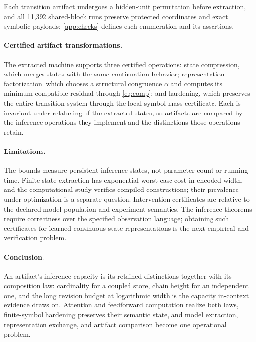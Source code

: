 \documentclass{article}
\theoremstyle{definition}
\begin{document}
Each transition artifact undergoes a hidden-unit permutation before extraction, and all 11,392 shared-block runs preserve protected coordinates and exact symbolic payloads; \cref{app:checks} defines each enumeration and its assertions.

\paragraph{Certified artifact transformations.}
The extracted machine supports three certified operations: state compression, which merges states with the same continuation behavior; representation factorization, which chooses a structural congruence $\alpha$ and computes its minimum compatible residual through \eqref{eq:comp}; and hardening, which preserves the entire transition system through the local symbol-mass certificate. Each is invariant under relabeling of the extracted states, so artifacts are compared by the inference operations they implement and the distinctions those operations retain.

\paragraph{Limitations.}
The bounds measure persistent inference states, not parameter count or running time. Finite-state extraction has exponential worst-case cost in encoded width, and the computational study verifies compiled constructions; their prevalence under optimization is a separate question. Intervention certificates are relative to the declared model population and experiment semantics. The inference theorems require correctness over the specified observation language; obtaining such certificates for learned continuous-state representations is the next empirical and verification problem.

\paragraph{Conclusion.}
An artifact's inference capacity is its retained distinctions together with its composition law: cardinality for a coupled store, chain height for an independent one, and the long revision budget at logarithmic width is the capacity in-context evidence draws on. Attention and feedforward computation realize both laws, finite-symbol hardening preserves their semantic state, and model extraction, representation exchange, and artifact comparison become one operational problem.

\label{mainend}
\clearpage


\clearpage
\appendix
{}

\end{document}
